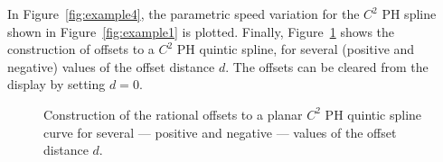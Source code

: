 \documentclass[12pt]{article}
\begin{document}
In Figure~\ref{fig:example4}, the parametric speed variation for the 
$C^2$ PH spline shown in Figure~\ref{fig:example1} is plotted. Finally, 
Figure~\ref{fig:example5} shows the construction of offsets 
to a $C^2$ PH quintic spline, for several (positive and negative) 
values of the offset distance $d$. The offsets can be
cleared from the display by setting $d=0$.

\begin{figure}[htbp]
\centering
{}\textwidth {}
\caption{Construction of the rational offsets to a planar $C^2$ PH quintic 
spline curve for several --- positive and negative --- values of the offset 
distance $d$.}
\label{fig:example5}
\end{figure}
\end{document}
